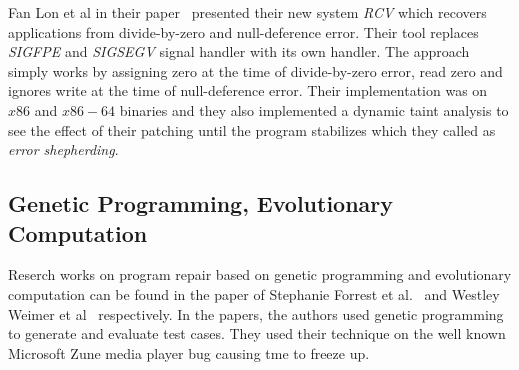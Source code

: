 Fan Lon et al in their paper~\cite{DBLP:conf/pldi/LongSR14} presented their new
system \emph{RCV} which recovers applications from divide-by-zero and
null-deference error. Their tool replaces \emph{SIGFPE} and \emph{SIGSEGV}
signal handler with its own handler. The approach simply works by assigning
zero at the time of divide-by-zero error, read zero and ignores write at the time
of null-deference error. Their implementation was on $x86$ and $x86-64$
binaries and they also implemented a dynamic taint analysis to see the effect of their
patching until the program stabilizes which they called as \emph{error
shepherding}.

\subsection{Genetic Programming, Evolutionary Computation}
\label{subsec:RecWorksGeneric}

Reserch works on program repair based on genetic programming and evolutionary
computation can be found in the paper of Stephanie Forrest et
al.~\cite{DBLP:conf/gecco/2009g} and Westley Weimer et
al~\cite{DBLP:journals/cacm/WeimerFGN10} respectively. In the papers, the
authors used genetic programming to generate and evaluate test cases. They used
their technique on the well known Microsoft Zune media player bug causing tme
to freeze up.


